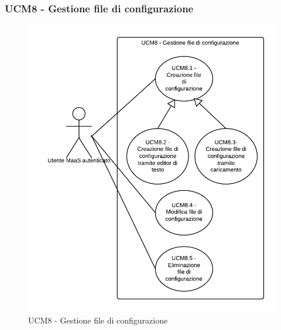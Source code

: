 \subsubsection{UCM8 - Gestione file di configurazione} 
    \begin{figure}[H]
      \begin{center}
      \includegraphics[scale=0.16]{UML/UCM8 - Gestione file di configurazione.png}
      \caption{UCM8 - Gestione file di configurazione}
      \end{center} 
    \end{figure}  
    
